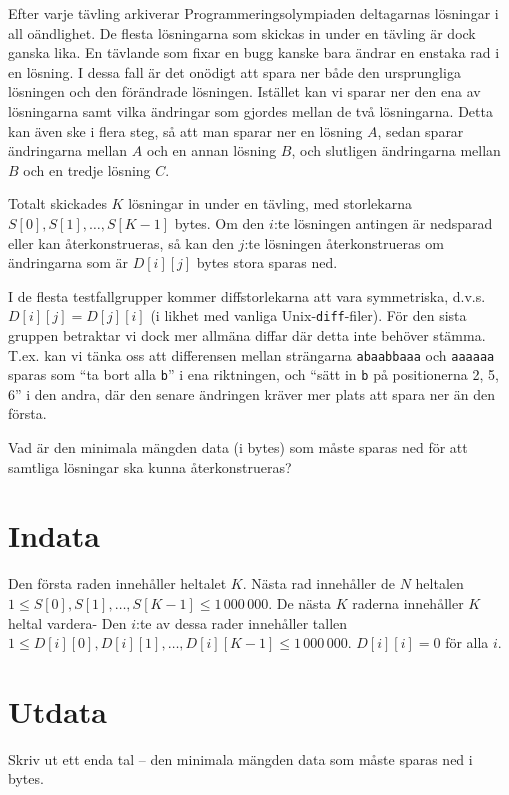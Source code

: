 Efter varje tävling arkiverar Programmeringsolympiaden deltagarnas lösningar i all oändlighet.
De flesta lösningarna som skickas in under en tävling är dock ganska lika.
En tävlande som fixar en bugg kanske bara ändrar en enstaka rad i en lösning.
I dessa fall är det onödigt att spara ner både den ursprungliga lösningen och den förändrade lösningen.
Istället kan vi sparar ner den ena av lösningarna samt vilka ändringar som gjordes mellan de två lösningarna.
Detta kan även ske i flera steg, så att man sparar ner en lösning $A$, sedan sparar ändringarna mellan $A$ och en annan lösning $B$, och slutligen ändringarna mellan $B$ och en tredje lösning $C$.

Totalt skickades $K$ lösningar in under en tävling, med storlekarna $S[0], S[1], \dots, S[K-1]$ bytes.
Om den $i$:te lösningen antingen är nedsparad eller kan återkonstrueras, så kan den $j$:te lösningen återkonstrueras om ändringarna som är $D[i][j]$ bytes stora sparas ned.

I de flesta testfallgrupper kommer diffstorlekarna att vara symmetriska, d.v.s. $D[i][j] = D[j][i]$ (i likhet med vanliga Unix-\texttt{diff}-filer).
För den sista gruppen betraktar vi dock mer allmäna diffar där detta inte behöver stämma.
T.ex. kan vi tänka oss att differensen mellan strängarna \texttt{abaabbaaa} och \texttt{aaaaaa} sparas som ``ta bort alla \texttt{b}'' i ena riktningen, och ``sätt in \texttt{b} på positionerna 2, 5, 6'' i den andra, där den senare ändringen kräver mer plats att spara ner än den första.

Vad är den minimala mängden data (i bytes) som måste sparas ned för att samtliga lösningar ska kunna återkonstrueras?

\section*{Indata}
Den första raden innehåller heltalet $K$.
Nästa rad innehåller de $N$ heltalen $1 \le S[0], S[1], \dots, S[K-1] \le 1\,000\,000$.
De nästa $K$ raderna innehåller $K$ heltal vardera-
Den $i$:te av dessa rader innehåller tallen $1 \le D[i][0], D[i][1], \dots, D[i][K-1] \le 1\,000\,000$.
$D[i][i] = 0$ för alla $i$.

\section*{Utdata}
Skriv ut ett enda tal -- den minimala mängden data som måste sparas ned i bytes.

